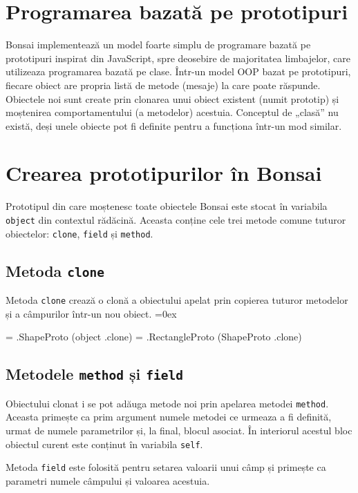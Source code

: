 \documentclass[12pt,a4paper]{memoir}
\renewcommand{\c}{\texttt}
\newenvironment{code}
{
\definecolor{shadecolor}{gray}{0.91}
\topsep=0ex
\relax
\shaded
\verbatim
}
{
\endverbatim
\endshaded
}
\begin{document}
\section{Programarea bazată pe prototipuri}

Bonsai implementează un model foarte simplu de programare bazată pe prototipuri\cite{prototype_based_programming} inspirat din JavaScript, spre deosebire de majoritatea limbajelor, care utilizeaza programarea bazată pe clase. Într-un model OOP bazat pe prototipuri, fiecare obiect are propria listă de metode (mesaje) la care poate răspunde. Obiectele noi sunt create prin clonarea unui obiect existent (numit prototip) și moștenirea comportamentului (a metodelor) acestuia. Conceptul de „clasă” nu există, deși unele obiecte pot fi definite pentru a funcționa într-un mod similar. 

\section{Crearea prototipurilor în Bonsai}

Prototipul din care moștenesc toate obiectele Bonsai este stocat în variabila \c{object} din contextul rădăcină. Aceasta conține cele trei metode comune tuturor obiectelor: \c{clone}, \c{field} și \c{method}.

\subsection{Metoda \c{clone}}

Metoda \c{clone} crează o clonă a obiectului apelat prin copierea tuturor metodelor și a câmpurilor într-un nou obiect. 
\begin{code}
= .ShapeProto (object .clone)
= .RectangleProto (ShapeProto .clone)
\end{code}

\subsection{Metodele \c{method} și \c{field}}

Obiectului clonat i se pot adăuga metode noi prin apelarea metodei \c{method}. Aceasta primește ca prim argument numele metodei ce urmeaza a fi definită, urmat de numele parametrilor și, la final, blocul asociat. În interiorul acestul bloc obiectul curent este conținut în variabila \c{self}.

Metoda \c{field} este folosită pentru setarea valoarii unui câmp și primește ca parametri numele câmpului și valoarea acestuia.
\end{document}
